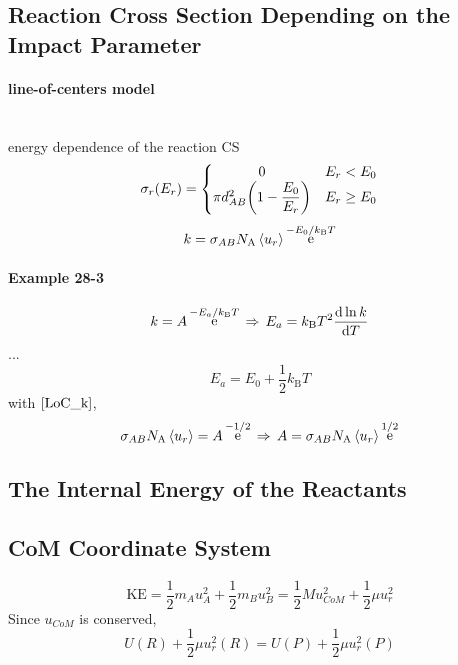 \documentclass[a4paper]{article}
\DeclareMathOperator{\e}{\mathrm{e}}
\newcommand{\NA}{N_\mathrm{A}}
\newcommand{\kB}{k_\mathrm{B}}
\DeclareMathOperator{\dra}{\;\Rightarrow\;}
\numberwithin{equation}{section}
\begin{document}
\subsection{Reaction Cross Section Depending on the Impact Parameter}
\paragraph{line-of-centers model}~\\
energy dependence of the reaction CS
\begin{equation}\label{key}
\sigma_r(E_r) = \left\{
\mqty{0            & E_r<E_0\\
	\pi d_{AB}^2\qty(1-\dfrac{E_0}{E_r}) & E_r \geq E_0}\right.
\end{equation}
\begin{equation}\label{LoC_k}
k = \sigma_{AB}\NA \ev{u_r} \e^{-E_0/\kB T}
\end{equation}
\paragraph{Example 28-3}
\begin{equation}\label{key}
k = A\e^{-E_a/\kB T} \dra E_a = \kB T^2\dv{\ln k}{T}
\end{equation}
...
\begin{equation}\label{key}
E_a = E_0 + \dfrac{1}{2}\kB T
\end{equation}
with $ \eqref{LoC_k} $,
\begin{equation}\label{key}
\sigma_{AB}\NA \ev{u_r} = A\e^{-1/2} \dra A = \sigma_{AB}\NA \ev{u_r}\e^{1/2}
\end{equation}

\subsection{}

\subsection{The Internal Energy of the Reactants}

\subsection{CoM Coordinate System}
\begin{equation}\label{key}
\text{KE} = \dfrac{1}{2}m_Au_A^2 +\dfrac{1}{2}m_Bu_B^2 = \dfrac{1}{2}M u_{CoM}^2 + \dfrac{1}{2}\mu u_r^2
\end{equation}
Since $ u_{CoM} $ is conserved,
\begin{equation}\label{key}
U(R) + \dfrac{1}{2}\mu u_r^2(R) = U(P) + \dfrac{1}{2}\mu u_r^2(P)
\end{equation}
\end{document}
